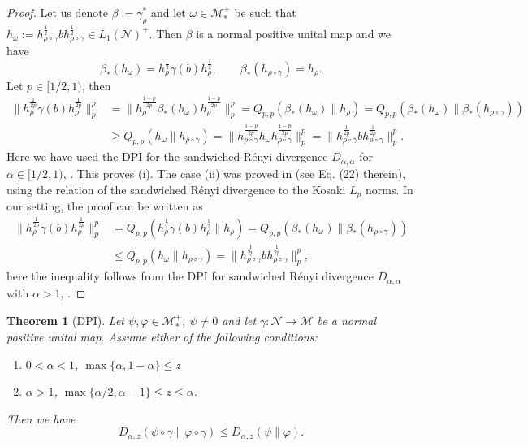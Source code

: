 \documentclass[12pt]{article}
\newtheorem{theorem}{Theorem}[section]
\theoremstyle{definition}
\theoremstyle{remark}
\numberwithin{equation}{section}
\def\Me{\mathcal M}
\def\Ne{\mathcal N}
\begin{document}
\begin{proof} Let us denote $\beta:=\gamma_\rho^*$ and let $\omega\in \Me_*^+$ be such
that 
$h_\omega:=h_{\rho\circ\gamma}^{\frac12}bh_{\rho\circ\gamma}^{\frac12}\in L_1(\Ne)^+$. Then
$\beta$ is a normal positive unital map and  we have 
\[
\beta_*(h_\omega)=h_\rho^{\frac12}\gamma(b)h_\rho^{\frac12},\qquad
\beta_*(h_{\rho\circ\gamma})=h_\rho.
\]
Let $p\in [1/2,1)$, then  
\begin{align*}
\|h_{\rho}^{\frac{1}{2p}}\gamma(b)h_{\rho}^{\frac{1}{2p}}\|^p_p&=
\|h_\rho^{\frac{1-p}{2p}}\beta_*(h_\omega)h_\rho^{\frac{1-p}{2p}}\|_p^p=
Q_{p,p}(\beta_*(h_\omega)\|h_\rho)=Q_{p,p}(\beta_*(h_\omega)\|\beta_*(h_{\rho\circ\gamma}))\\
&\ge  Q_{p,p}(h_\omega\|h_{\rho\circ\gamma})=\|h_{\rho\circ\gamma}^{\frac{1-p}{2p}}h_\omega
h_{\rho\circ\gamma}^{\frac{1-p}{2p}}\|_p^p=\|h_{\rho\circ\gamma}^{\frac{1}{2p}}bh_{\rho\circ\gamma}^{\frac{1}{2p}}\|^p_p.
\end{align*}
Here we have used the DPI for the sandwiched R\'enyi  divergence $D_{\alpha,\alpha}$ for
$\alpha\in [1/2,1)$, \cite[Theorem 4.1]{jencova2021renyi}.  This proves (i). 
The case (ii) was proved in \cite{kato2023onrenyi} (see Eq. (22) therein), using the
relation of the sandwiched R\'enyi divergence to the Kosaki $L_p$ norms. In our setting,
the proof can be written as 
\begin{align*}
\|h_\rho^{\frac1{2p}}\gamma(b)h_\rho^{\frac{1}{2p}}\|_p^p&=Q_{p,p}(h_\rho^{\frac12}\gamma(b)h_\rho^{\frac12}\|h_\rho)=Q_{p,p}(\beta_*(h_\omega)\|\beta_*(h_{\rho\circ\gamma}))\\
&\le
Q_{p,p}(h_\omega\|h_{\rho\circ\gamma})=\|h_{\rho\circ\gamma}^{\frac{1}{2p}}bh_{\rho\circ\gamma}^{\frac{1}{2p}}\|^p_p,
\end{align*}
here the inequality follows from the DPI for sandwiched R\'enyi divergence
$D_{\alpha,\alpha}$ with
$\alpha>1$, \cite[]{jencova2018renyi}.


\end{proof}




\begin{theorem}[DPI] \label{thm:dpi} Let $\psi,\varphi\in \Me_*^+$, $\psi\ne 0$ and let $\gamma:
\Ne\to \Me$ be a normal positive unital map. Assume either of the following conditions:
\begin{enumerate}
\item[(i)] $0<\alpha<1$, $\max\{\alpha,1-\alpha\}\le z$
\item[(ii)] $\alpha>1$, $\max\{\alpha/2,\alpha-1\}\le z\le \alpha$.
\end{enumerate}
Then we have
\[
D_{\alpha,z}(\psi\circ\gamma\|\varphi\circ\gamma)\le D_{\alpha,z}(\psi\|\varphi).
\]


\end{theorem}
\end{document}
